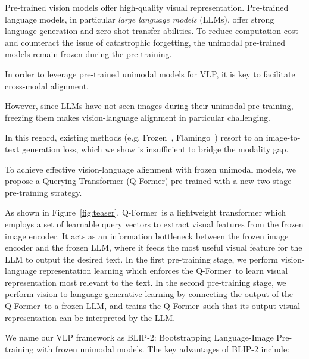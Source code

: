 Pre-trained vision models offer high-quality visual representation. Pre-trained language models, in particular \textit{large language models} (LLMs), offer strong language generation and zero-shot transfer abilities. To reduce computation cost and counteract the issue of catastrophic forgetting, the unimodal pre-trained models remain frozen during the pre-training.

In order to leverage pre-trained unimodal models for VLP, it is key to facilitate cross-modal alignment.

However, since LLMs have not seen images during their unimodal pre-training, freezing them makes vision-language alignment in particular challenging.

In this regard, existing methods (e.g. Frozen~\cite{Frozen}, Flamingo~\cite{flamingo}) resort to an image-to-text generation loss, which we show is insufficient to bridge the modality gap.

To achieve effective vision-language alignment with frozen unimodal models, we propose a Querying Transformer (Q-Former) pre-trained with a new two-stage pre-training strategy.

As shown in Figure~\ref{fig:teaser},
Q-Former~is a lightweight transformer which employs a set of learnable query vectors to extract visual features from the frozen image encoder. It acts as an information bottleneck between the frozen image encoder and the frozen LLM, where it feeds the most useful visual feature for the LLM to output the desired text. In the first pre-training stage, we perform vision-language representation learning which enforces the Q-Former~to learn visual representation most relevant to the text. In the second pre-training stage, we perform vision-to-language generative learning by connecting the output of the Q-Former~to a frozen LLM, and trains the Q-Former~such that its output visual representation can be interpreted by the LLM.

We name our VLP framework as BLIP-2: Bootstrapping Language-Image Pre-training with frozen unimodal models. The key advantages of BLIP-2 include:

